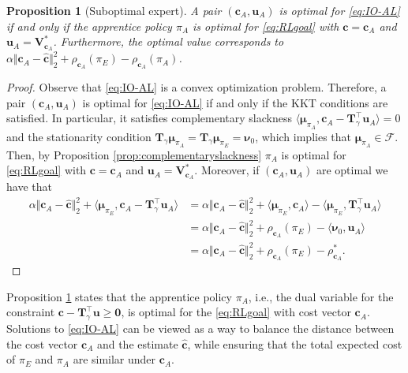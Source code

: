 \documentclass[10pt]{article} %
\newtheorem{proposition}{Proposition}
\def\F{\ensuremath{\mathcal{F}}}
\def\mTg{{\bm{T}}_\gamma}
\def\vzero{{\bm{0}}}
\def\vc{{\bm{c}}}
\def\vu{{\bm{u}}}
\def\vV{{\bm{V}}}
\def\vmu{{\bm{\mu}}}
\def\vnu{{\bm{\nu}}}
\begin{document}
\begin{proposition}[Suboptimal expert] \label{prop:suboptimalexpert}
    A pair $(\vc_A, \vu_A)$ is optimal for \eqref{eq:IO-AL} if and only if the apprentice policy $\pi_A$ is optimal for \eqref{eq:RLgoal} with $\vc=\vc_A$ and $\vu_A = \vV^*_{\vc_A}$. Furthermore, the optimal value corresponds to $\alpha\Vert \vc_A - \hat{\vc} \Vert^2_2 + \rho_{\vc_A}(\pi_E) - \rho_{\vc_A}(\pi_A)$.
\end{proposition}
\begin{proof}
    Observe that \eqref{eq:IO-AL} is a convex optimization problem. Therefore, a pair $(\vc_A, \vu_A)$ is optimal for \eqref{eq:IO-AL} if and only if the KKT conditions are satisfied. In particular, it satisfies complementary slackness $\langle\vmu_{\pi_A}, \vc_A - \mTg^\top \vu_{A}\rangle = 0$ and the stationarity condition $\mTg \vmu_{\pi_A}=\mTg \vmu_{\pi_E}=\vnu_0$, which implies that $\vmu_{\pi_A}\in\F$. Then, by Proposition \ref{prop:complementaryslackness} $\pi_A$ is optimal for \eqref{eq:RLgoal} with $\vc=\vc_A$ and $\vu_A = \vV_{\vc_A}^*$. Moreover, if $(\vc_A, \vu_A)$ are optimal we have that
    \begin{align*}
        \alpha\Vert \vc_A - \hat{\vc} \Vert^2_2 + \langle \vmu_{\pi_E}, \vc_A - \mTg^\top \vu_A \rangle &= \alpha\Vert \vc_A - \hat{\vc} \Vert^2_2 + \langle \vmu_{\pi_E}, \vc_A \rangle - \langle \vmu_{\pi_E}, \mTg^\top \vu_A\rangle\\
        &= \alpha\Vert \vc_A - \hat{\vc} \Vert^2_2 + \rho_{\vc_A}(\pi_E) - \langle \vnu_0, \vu_A\rangle\\
        &= \alpha\Vert \vc_A - \hat{\vc} \Vert^2_2 + \rho_{\vc_A}(\pi_E) - \rho_{\vc_A}^*.
    \end{align*}
\end{proof}
Proposition \ref{prop:suboptimalexpert} states that the apprentice policy $\pi_A$, i.e., the dual variable for the constraint $\vc - \mTg^\top \vu \geq \vzero$, is optimal for the \eqref{eq:RLgoal} with cost vector $\vc_A$. Solutions to \eqref{eq:IO-AL} can be viewed as a way to balance the distance between the cost vector $\vc_A$ and the estimate $\hat{\vc}$, while ensuring that the total expected cost of $\pi_E$ and $\pi_A$ are similar under $\vc_A$. \par
\end{document}
